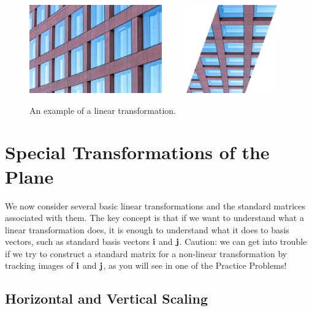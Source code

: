 \documentclass{ximera}
\renewcommand{\vec}[1]{{\bf #1}}
\newtheorem{initprob}{Exploration Problem}
\begin{document}
\begin{figure}[h]
    \centering
  
       \includegraphics[height=1.5in]{building1.jpg}
~~~~~\includegraphics[height=1.5in]{building2.jpg}
      
    \caption{An example of a linear transformation.}\label{fig:building}
\end{figure}

\section*{Special Transformations of the Plane}
We now consider several basic linear transformations and the standard matrices associated with them.  The key concept is that if we want to understand what a linear transformation does, it is enough to understand what it does to basis vectors, such as standard basis vectors $\vec{i}$ and $\vec{j}$.  Caution: we can get into trouble if we try to construct a standard matrix for a non-linear transformation by tracking images of $\vec{i}$ and $\vec{j}$, as you will see in one of the Practice Problems!  %

\subsection*{Horizontal and Vertical Scaling} 

\end{document}
